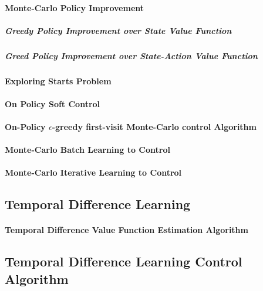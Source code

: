 		\paragraph*{Monte-Carlo Policy Improvement}

			\subparagraph*{Greedy Policy Improvement over State Value Function}

			\subparagraph*{Greed Policy Improvement over State-Action Value Function}

		\paragraph*{Exploring Starts Problem}

		\paragraph*{On Policy Soft Control}
		
		\paragraph*{On-Policy $\epsilon$-greedy first-visit Monte-Carlo control Algorithm}

		\paragraph*{Monte-Carlo Batch Learning to Control}

		\paragraph*{Monte-Carlo Iterative Learning to Control}

	\subsection{Temporal Difference Learning} %
		\label{sub:temporal_difference_learning}
		
		\paragraph*{Temporal Difference Value Function Estimation Algorithm}

	\subsection{Temporal Difference Learning Control Algorithm} %
		\label{sub:temporal_difference_learning_control_algorithm}
		
